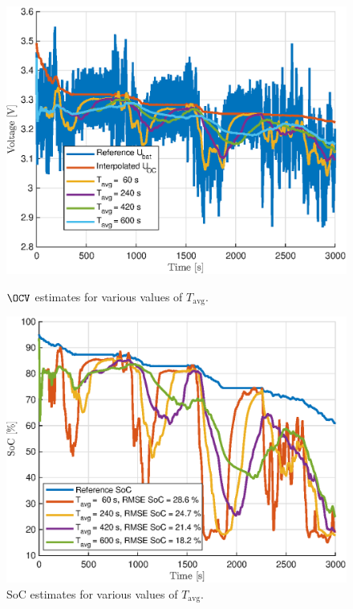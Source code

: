 \begin{figure}[b]
\centering
\begin{minipage}{0.49\textwidth}
    \centering
    \includegraphics[width=\textwidth]{figures/7/OCV-Ubat.eps}
    \caption{$\OCV$ estimates for various values of $T_\text{avg}$.}
    \label{fig:7-OCV-Ubat}
\end{minipage}
\hfill
\begin{minipage}{0.49\textwidth}
    \centering
    \includegraphics[width=\textwidth]{figures/7/OCV-SOC.eps}
    \caption{SoC estimates for various values of $T_\text{avg}$.}
    \label{fig:7-OCV-SOC}
\end{minipage}

\end{figure}

